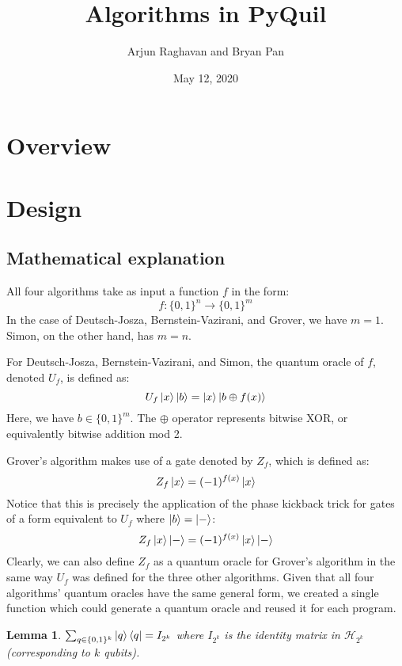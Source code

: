 \documentclass[12pt]{article}
\title{Algorithms in PyQuil}
\author{Arjun Raghavan and Bryan Pan}
\date{May 12, 2020}
\newtheorem{lemma}{Lemma}
\begin{document}
\mktitle
\startbody

\section{Overview}
\section{Design}

\subsection{Mathematical explanation}

All four algorithms take as input a function $f$ in the form:
\[
    f : \{0,1\}^n \to \{0,1\}^m
\]
In the case of Deutsch-Josza, Bernstein-Vazirani, and Grover, we have $m=1$.
Simon, on the other hand, has $m=n$.

For Deutsch-Josza, Bernstein-Vazirani, and Simon, the quantum oracle of $f$, denoted $U_f$, is defined as:
\[
    U_f\ket{x}\ket{b} = \ket{x}\ket{b \oplus f(x)}
\]
Here, we have $b \in \{0,1\}^m$.
The $\oplus$ operator represents bitwise XOR, or equivalently bitwise addition mod 2.

Grover's algorithm makes use of a gate denoted by $Z_f$, which is defined as:
\[
    Z_f\ket{x} = (-1)^{f(x)}\ket{x}
\]
Notice that this is precisely the application of the phase kickback trick for gates of a form equivalent to $U_f$ where $\ket{b} = \ket{-}$:
\[
    Z_f\ket{x}\ket{-} = (-1)^{f(x)}\ket{x}\ket{-}
\]
Clearly, we can also define $Z_f$ as a quantum oracle for Grover's algorithm in the same way $U_f$ was defined for the three other algorithms.
Given that all four algorithms' quantum oracles have the same general form, we created a single function which could generate a quantum oracle and reused it for each program.

\begin{lemma}
    $\sum_{q \in \{0,1\}^k}{\ket{q}\bra{q}} = I_{2^k}$ where $I_{2^k}$ is the identity matrix in $\mathcal{H}_{2^k}$ (corresponding to $k$ qubits).
\end{lemma}
\end{document}
